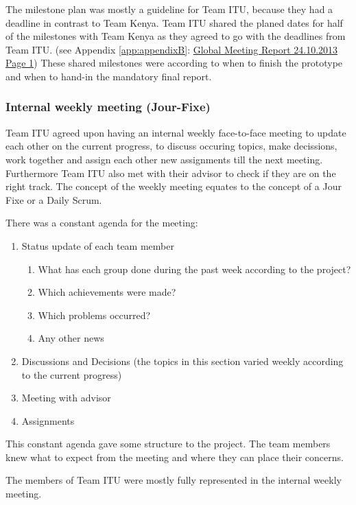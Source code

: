The milestone plan was mostly a guideline for Team ITU, because they had a deadline in contrast to Team Kenya. Team ITU shared the planed dates for half of the milestones with Team Kenya as they agreed to go with the deadlines from Team ITU. (see Appendix \ref{app:appendixB}: \hyperlink{GSD20131024.1}{Global Meeting Report 24.10.2013 Page 1}) These shared milestones were according to when to finish the prototype and when to hand-in the mandatory final report.


\subsubsection{Internal weekly meeting (Jour-Fixe)}
\label{sec:internal_meeting}
Team ITU agreed upon having an internal weekly face-to-face meeting to update each other on the current progress, to discuss occuring topics, make decissions, work together and assign each other new assignments till the next meeting. Furthermore Team ITU also met with their advisor to check if they are on the right track. The concept of the weekly meeting equates to the concept of a Jour Fixe\cite{jour_fixe} or a Daily Scrum\cite{scrum}.

There was a constant agenda for the meeting:

	\begin{enumerate}
		\item Status update of each team member
			\begin{enumerate}
				\item What has each group done during the past week according to the project?
				\item Which achievements were made?	
				\item Which problems occurred?
				\item Any other news
			\end{enumerate}
		\item Discussions and Decisions (the topics in this section varied weekly according to the current progress)
		\item Meeting with advisor	
		\item Assignments
	\end{enumerate}

This constant agenda gave some structure to the project. The team members knew what to expect from the meeting and where they can place their concerns.

The members of Team ITU were mostly fully represented in the internal weekly meeting. 

